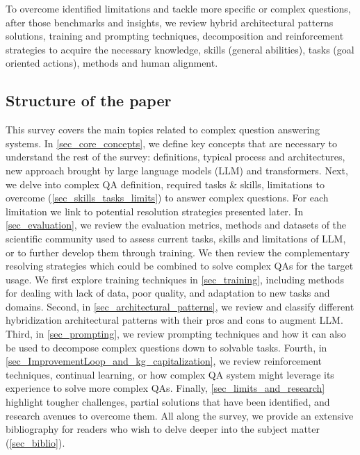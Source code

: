 \documentclass[acmsmall]{acmart}
\begin{document}
To overcome identified limitations and tackle more specific or complex questions, after those benchmarks and insights, we review hybrid architectural patterns solutions, training and prompting techniques, decomposition and reinforcement strategies to acquire the necessary knowledge, skills (general abilities), tasks (goal oriented actions), methods and human alignment.

\subsection{Structure of the paper}
This survey covers the main topics related to complex question answering systems.
In \autoref{sec_core_concepts}, we define key concepts that are necessary to understand the rest of the survey: definitions, typical process and architectures, new approach brought by large language models (LLM) and transformers.
Next, we delve into complex QA definition, required tasks \& skills, limitations to overcome (\autoref{sec_skills_tasks_limits}) to answer complex questions. For each limitation we link to potential resolution strategies presented later.
In \autoref{sec_evaluation}, we review the evaluation metrics, methods and datasets of the scientific community used to assess current tasks, skills and limitations of LLM, or to further develop them through training.
We then review the complementary resolving strategies which could be combined to solve complex QAs for the target usage.
We first explore training techniques in \autoref{sec_training}, including methods for dealing with lack of data, poor quality, and adaptation to new tasks and domains.
Second, in \autoref {sec_architectural_patterns}, we review and classify different hybridization architectural patterns with their pros and cons to augment LLM.
Third, in \autoref{sec_prompting}, we review prompting techniques and how it can also be used to decompose complex questions down to solvable tasks.
Fourth, in \autoref{sec_ImprovementLoop_and_kg_capitalization}, we review reinforcement techniques, continual learning, or how complex QA system might leverage its experience to solve more complex QAs. 
Finally, \autoref{sec_limits_and_research} highlight tougher challenges, partial solutions that have been identified, and research avenues to overcome them.
All along the survey, we provide an extensive bibliography for readers who wish to delve deeper into the subject matter (\autoref{sec_biblio}).
\end{document}

